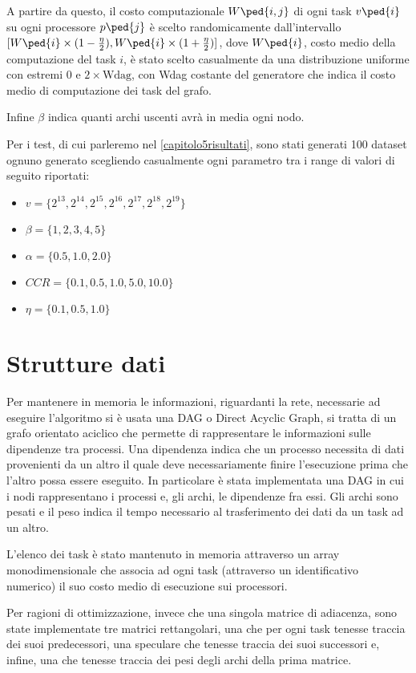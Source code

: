 A partire da questo, il costo computazionale $W\ped{i,j}$ di ogni task $v\ped{i}$ su ogni processore $p\ped{j}$ è scelto randomicamente dall'intervallo $[W\ped{i}\times (1-\frac{\eta}{2}), W\ped{i}\times (1+\frac{\eta}{2})]$, dove $W\ped{i}$, costo medio della computazione del task $i$, è stato scelto casualmente da una distribuzione uniforme con estremi $0$ e $2 \times \text{Wdag}$, con Wdag costante del generatore che indica il costo medio di computazione dei task del grafo.

Infine $\beta$ indica quanti archi uscenti avrà in media ogni nodo.

Per i test, di cui parleremo nel \autoref{capitolo5risultati}, sono stati generati 100 dataset ognuno generato scegliendo casualmente ogni parametro tra i range di valori di seguito riportati:
\begin{itemize}
	\item{$v = \{2^{13}, 2^{14}, 2^{15}, 2^{16}, 2^{17}, 2^{18}, 2^{19}\}$}
	\item{$\beta =\{1, 2, 3, 4, 5\}$}
	\item{$\alpha = \{0.5, 1.0, 2.0\}$}
	\item{$CCR = \{0.1, 0.5, 1.0, 5.0, 10.0\}$}
	\item{$\eta = \{0.1, 0.5, 1.0\}$}
\end{itemize}

\section{Strutture dati}
Per mantenere in memoria le informazioni, riguardanti la rete, necessarie ad eseguire l'algoritmo si è usata una DAG o Direct Acyclic Graph, si tratta di un grafo orientato aciclico che permette di rappresentare le informazioni sulle dipendenze tra processi. Una dipendenza indica che un processo necessita di dati provenienti da un altro il quale deve necessariamente finire l'esecuzione prima che l'altro possa essere eseguito.
In particolare è stata implementata una DAG in cui i nodi rappresentano i processi e, gli archi, le dipendenze fra essi. Gli archi sono pesati e il peso indica il tempo necessario al trasferimento dei dati da un task ad un altro.

L'elenco dei task è stato mantenuto in memoria attraverso un array monodimensionale che associa ad ogni task (attraverso un identificativo numerico) il suo costo medio di esecuzione sui processori.

Per ragioni di ottimizzazione, invece che una singola matrice di adiacenza, sono state implementate tre matrici rettangolari, una che per ogni task tenesse traccia dei suoi predecessori, una speculare che tenesse traccia dei suoi successori e, infine, una che tenesse traccia dei pesi degli archi della prima matrice.

